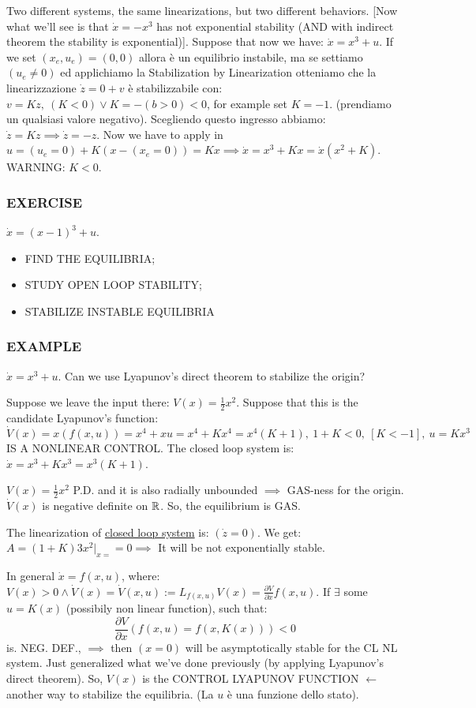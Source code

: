 Two different systems, the same linearizations, but two different behaviors. [Now what we'll see is that $\dot{x}=-x^3$ has not exponential stability (AND with indirect theorem the stability is exponential)]. Suppose that now we have: $\dot{x}=x^3 + u$. If we set $(x_e,u_e) = (0,0)$ allora è un equilibrio instabile, ma se settiamo $(u_e \neq 0)$ ed applichiamo la Stabilization by Linearization otteniamo che la linearizzazione $\dot{z}= 0 + v$ è stabilizzabile con: $v=Kz,\ (K < 0) \lor K=-(b>0)<0$, for example set $K=-1$. (prendiamo un qualsiasi valore negativo). Scegliendo questo ingresso abbiamo: $\dot{z}=Kz \implies \dot{z}=-z$. Now we have to apply in $u=(u_e=0) + K(x-(x_e=0)) = Kx \implies \dot{x}=x^3 + Kx = \dot{x}(x^2 +K)$. WARNING: $K<0$. 

\subsubsection{EXERCISE}

$\dot{x}=(x-1)^3 + u$.

\begin{itemize}
\item FIND THE EQUILIBRIA;
\item STUDY OPEN LOOP STABILITY;
\item STABILIZE INSTABLE EQUILIBRIA
\end{itemize}

\subsubsection{EXAMPLE}

$\dot{x}=x^3 + u$. Can we use Lyapunov's direct theorem to stabilize the origin?

Suppose we leave the input there: $V(x)=\frac{1}{2}x^2$. Suppose that this is the candidate Lyapunov's function: $\dot{V}(x) = x(f(x,u)) = x^4 + xu = x^4 + Kx^4 = x^4(K+1),\ 1+K < 0,\ [K<-1],\ u=Kx^3$ IS A NONLINEAR CONTROL. The closed loop system is: $\dot{x}=x^3 + Kx^3 = x^3(K+1)$.

$V(x) = \frac{1}{2}x^2$ P.D. and it is also radially unbounded $\implies$ GAS-ness for the origin. $\dot{V}(x)$ is negative definite on $\mathbb{R}$. So, the equilibrium is GAS.

The linearization of \underline{closed loop system} is: $(\dot{z}=0)$. We get: $A = (1+K)3x^2|_{x=} = 0 \implies$ It will be not exponentially stable. 

In general $\dot{x}=f(x,u)$, where: $V(x) > 0 \land \dot{V}(x) = \dot{V}(x,u) := L_{f(x,u)}V(x) = \frac{\partial{V}}{\partial{x}}f(x,u)$. If $\exists$ some $u=K(x)$ (possibily non linear function), such that:
\[
	\frac{\partial{V}}{\partial{x}}(f(x,u) = f(x,K(x))) < 0
\]
is. NEG. DEF., $\implies$ then $(x=0)$ will be asymptotically stable for the CL NL system. Just generalized what we've done previously (by applying Lyapunov's direct theorem). 
So, $V(x)$ is the CONTROL LYAPUNOV FUNCTION $\leftarrow$ another way to stabilize the equilibria. (La $u$ è una funzione dello stato).

